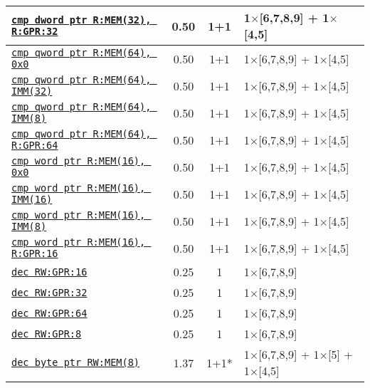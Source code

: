 \documentclass[a4paper,english,fontsize=9]{scrartcl}
\begin{document}
\begin{longtable}{p{}ccL{.25\textwidth}}
  \midrule
  \texttt{\href{https://felixcloutier.com/x86/CMP.html}{cmp dword ptr R:MEM(32), R:GPR:32}} & 0.50 & 1+1 & 1\(\times\)[6,7,8,9] + 1\(\times\)[4,5] \\
  \midrule
  \texttt{\href{https://felixcloutier.com/x86/CMP.html}{cmp qword ptr R:MEM(64), 0x0}} & 0.50 & 1+1 & 1\(\times\)[6,7,8,9] + 1\(\times\)[4,5] \\
  \midrule
  \texttt{\href{https://felixcloutier.com/x86/CMP.html}{cmp qword ptr R:MEM(64), IMM(32)}} & 0.50 & 1+1 & 1\(\times\)[6,7,8,9] + 1\(\times\)[4,5] \\
  \midrule
  \texttt{\href{https://felixcloutier.com/x86/CMP.html}{cmp qword ptr R:MEM(64), IMM(8)}} & 0.50 & 1+1 & 1\(\times\)[6,7,8,9] + 1\(\times\)[4,5] \\
  \midrule
  \texttt{\href{https://felixcloutier.com/x86/CMP.html}{cmp qword ptr R:MEM(64), R:GPR:64}} & 0.50 & 1+1 & 1\(\times\)[6,7,8,9] + 1\(\times\)[4,5] \\
  \midrule
  \texttt{\href{https://felixcloutier.com/x86/CMP.html}{cmp word ptr R:MEM(16), 0x0}} & 0.50 & 1+1 & 1\(\times\)[6,7,8,9] + 1\(\times\)[4,5] \\
  \midrule
  \texttt{\href{https://felixcloutier.com/x86/CMP.html}{cmp word ptr R:MEM(16), IMM(16)}} & 0.50 & 1+1 & 1\(\times\)[6,7,8,9] + 1\(\times\)[4,5] \\
  \midrule
  \texttt{\href{https://felixcloutier.com/x86/CMP.html}{cmp word ptr R:MEM(16), IMM(8)}} & 0.50 & 1+1 & 1\(\times\)[6,7,8,9] + 1\(\times\)[4,5] \\
  \midrule
  \texttt{\href{https://felixcloutier.com/x86/CMP.html}{cmp word ptr R:MEM(16), R:GPR:16}} & 0.50 & 1+1 & 1\(\times\)[6,7,8,9] + 1\(\times\)[4,5] \\
  \midrule
  \texttt{\href{https://felixcloutier.com/x86/DEC.html}{dec RW:GPR:16}} & 0.25 & 1 & 1\(\times\)[6,7,8,9] \\
  \midrule
  \texttt{\href{https://felixcloutier.com/x86/DEC.html}{dec RW:GPR:32}} & 0.25 & 1 & 1\(\times\)[6,7,8,9] \\
  \midrule
  \texttt{\href{https://felixcloutier.com/x86/DEC.html}{dec RW:GPR:64}} & 0.25 & 1 & 1\(\times\)[6,7,8,9] \\
  \midrule
  \texttt{\href{https://felixcloutier.com/x86/DEC.html}{dec RW:GPR:8}} & 0.25 & 1 & 1\(\times\)[6,7,8,9] \\
  \midrule
  \texttt{\href{https://felixcloutier.com/x86/DEC.html}{dec byte ptr RW:MEM(8)}} & 1.37 & 1+1* & 1\(\times\)[6,7,8,9] + 1\(\times\)[5] + 1\(\times\)[4,5] \\

\end{longtable}
\end{document}
